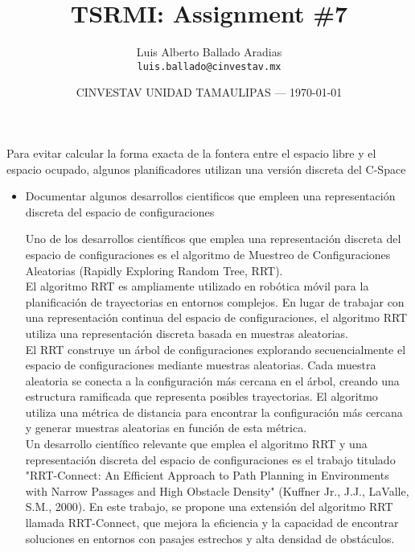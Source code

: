 \documentclass{article}
\title{TSRMI: Assignment \#7} %
\author{Luis Alberto Ballado Aradias\\ \texttt{luis.ballado@cinvestav.mx}} %
\date{CINVESTAV UNIDAD TAMAULIPAS --- \today} %
\begin{document}
\maketitle %


Para evitar calcular la forma exacta de la fontera entre el espacio libre y el espacio ocupado, algunos planificadores utilizan una versión discreta del C-Space 
\begin{itemize} %
\item {Documentar algunos desarrollos cientificos que empleen una representación discreta del espacio de configuraciones}

  Uno de los desarrollos científicos que emplea una representación discreta del espacio de configuraciones es el algoritmo de Muestreo de Configuraciones Aleatorias (Rapidly Exploring Random Tree, RRT).\\

  El algoritmo RRT es ampliamente utilizado en robótica móvil para la planificación de trayectorias en entornos complejos. En lugar de trabajar con una representación continua del espacio de configuraciones, el algoritmo RRT utiliza una representación discreta basada en muestras aleatorias.\\

  El RRT construye un árbol de configuraciones explorando secuencialmente el espacio de configuraciones mediante muestras aleatorias. Cada muestra aleatoria se conecta a la configuración más cercana en el árbol, creando una estructura ramificada que representa posibles trayectorias. El algoritmo utiliza una métrica de distancia para encontrar la configuración más cercana y generar muestras aleatorias en función de esta métrica.\\

  Un desarrollo científico relevante que emplea el algoritmo RRT y una representación discreta del espacio de configuraciones es el trabajo titulado "RRT-Connect: An Efficient Approach to Path Planning in Environments with Narrow Passages and High Obstacle Density" (Kuffner Jr., J.J., LaValle, S.M., 2000). En este trabajo, se propone una extensión del algoritmo RRT llamada RRT-Connect, que mejora la eficiencia y la capacidad de encontrar soluciones en entornos con pasajes estrechos y alta densidad de obstáculos.\\


\end{itemize}
\end{document}
